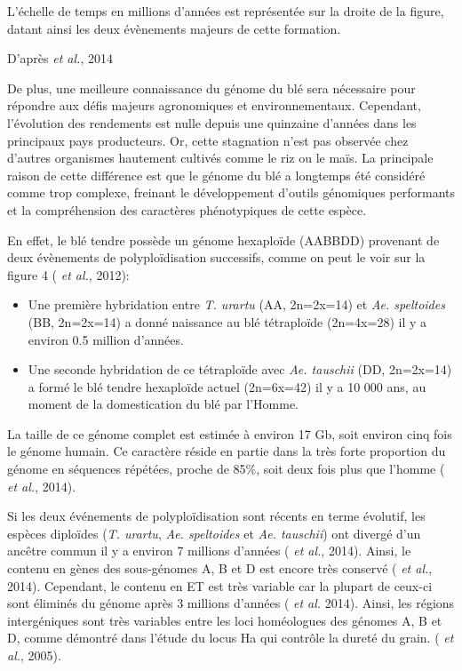 \documentclass[a4paper, 12pt]{article}
\begin{document}
\begin{onehalfspace}
L'échelle de temps en millions d'années est représentée sur la droite de la figure, datant ainsi les deux évènements majeurs de cette formation.
\begin{flushright}
D'après  \textit{et al.}, 2014\\
\end{flushright}
\vfill
\addtocounter{page}{-1}
\newpage

De plus, une meilleure connaissance du génome du blé sera nécessaire pour répondre aux défis majeurs agronomiques et environnementaux. Cependant, l'évolution des rendements est nulle depuis une quinzaine d'années dans les principaux pays producteurs. Or, cette stagnation n'est pas observée chez d'autres organismes hautement cultivés comme le riz ou le maïs. La principale raison de cette différence est que le génome du blé a longtemps été considéré comme trop complexe, freinant le développement d'outils génomiques performants et la compréhension des caractères phénotypiques de cette espèce.

En effet, le blé tendre possède un génome hexaploïde (AABBDD) provenant de deux évènements de polyploïdisation successifs, comme on peut le voir sur la figure 4 ( \textit{et al.}, 2012):
\begin{itemize}
\item Une première hybridation entre \textit{T. urartu} (AA, 2n=2x=14) et \textit{Ae. speltoides} (BB, 2n=2x=14) a donné naissance au blé tétraploïde (2n=4x=28) il y a environ 0.5 million d'années.
\item Une seconde hybridation de ce tétraploïde avec \textit{Ae. tauschii} (DD, 2n=2x=14) a formé le blé tendre hexaploïde actuel (2n=6x=42) il y a 10 000 ans, au moment de la domestication du blé par l'Homme.
\end{itemize}

La taille de ce génome complet est estimée à environ 17 Gb, soit environ cinq fois le génome humain. Ce caractère réside en partie dans la très forte proportion du génome en séquences répétées, proche de 85\%, soit deux fois plus que l'homme ( \textit{et al.}, 2014). 

Si les deux événements de polyploïdisation sont récents en terme évolutif, les espèces diploïdes (\textit{T. urartu}, \textit{Ae. speltoides} et \textit{Ae. tauschii}) ont divergé d'un ancêtre commun il y a environ 7 millions d'années ( \textit{et al.}, 2014). Ainsi, le contenu en gènes des sous-génomes A, B et D est encore très conservé ( \textit{et al.}, 2014). Cependant, le contenu en ET est très variable car la plupart de ceux-ci sont éliminés du génome après 3 millions d'années ( \textit{et al.} 2014). Ainsi, les régions intergéniques sont très variables entre les loci homéologues des génomes A, B et D, comme démontré dans l'étude du locus Ha qui contrôle la dureté du grain. ( \textit{et al.}, 2005).


\end{onehalfspace}
\end{document}
